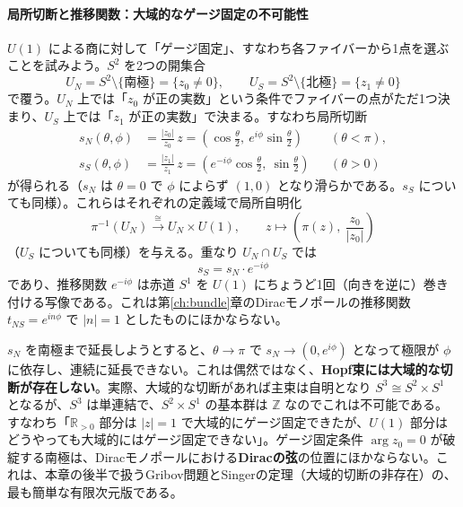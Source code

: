\documentclass[uplatex, dvipdfmx, book]{jsbook}
\begin{document}
\paragraph{局所切断と推移関数：大域的なゲージ固定の不可能性}
$U(1)$ による商に対して「ゲージ固定」、すなわち各ファイバーから1点を選ぶことを試みよう。$S^2$ を2つの開集合
\begin{equation}
    U_N = S^2 \setminus \{\text{南極}\} = \{z_0 \neq 0\}, \qquad U_S = S^2 \setminus \{\text{北極}\} = \{z_1 \neq 0\}
\end{equation}
で覆う。$U_N$ 上では「$z_0$ が正の実数」という条件でファイバーの点がただ1つ決まり、$U_S$ 上では「$z_1$ が正の実数」で決まる。すなわち局所切断
\begin{align}
    s_N(\theta, \phi) &= \frac{|z_0|}{z_0}\, z = \left( \cos\frac{\theta}{2},\ e^{i\phi}\sin\frac{\theta}{2} \right) && (\theta < \pi), \\
    s_S(\theta, \phi) &= \frac{|z_1|}{z_1}\, z = \left( e^{-i\phi}\cos\frac{\theta}{2},\ \sin\frac{\theta}{2} \right) && (\theta > 0)
\end{align}
が得られる（$s_N$ は $\theta = 0$ で $\phi$ によらず $(1, 0)$ となり滑らかである。$s_S$ についても同様）。これらはそれぞれの定義域で局所自明化
\begin{equation}
    \pi^{-1}(U_N) \xrightarrow{\ \cong\ } U_N \times U(1), \qquad z \mapsto \left( \pi(z),\ \frac{z_0}{|z_0|} \right)
\end{equation}
（$U_S$ についても同様）を与える。重なり $U_N \cap U_S$ では
\begin{equation}
    s_S = s_N \cdot e^{-i\phi}
    \label{eq:hopf-transition}
\end{equation}
であり、推移関数 $e^{-i\phi}$ は赤道 $S^1$ を $U(1)$ にちょうど1回（向きを逆に）巻き付ける写像である。これは第\ref{ch:bundle}章のDiracモノポールの推移関数 $t_{NS} = e^{in\phi}$ で $|n| = 1$ としたものにほかならない。

$s_N$ を南極まで延長しようとすると、$\theta \to \pi$ で $s_N \to (0, e^{i\phi})$ となって極限が $\phi$ に依存し、連続に延長できない。これは偶然ではなく、\textbf{Hopf束には大域的な切断が存在しない}。実際、大域的な切断があれば主束は自明となり $S^3 \cong S^2 \times S^1$ となるが、$S^3$ は単連結で、$S^2 \times S^1$ の基本群は $\mathbb{Z}$ なのでこれは不可能である。すなわち「$\mathbb{R}_{>0}$ 部分は $|z| = 1$ で大域的にゲージ固定できたが、$U(1)$ 部分はどうやっても大域的にはゲージ固定できない」。ゲージ固定条件 $\arg z_0 = 0$ が破綻する南極は、Diracモノポールにおける\textbf{Diracの弦}の位置にほかならない。これは、本章の後半で扱うGribov問題とSingerの定理（大域的切断の非存在）の、最も簡単な有限次元版である。
\end{document}
